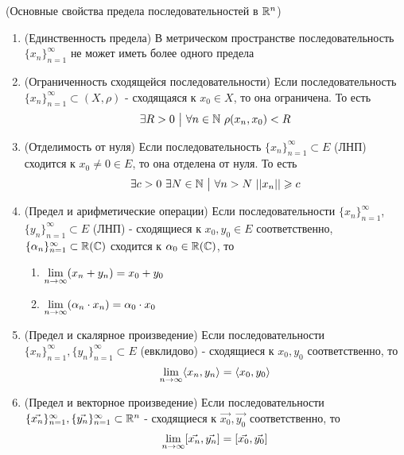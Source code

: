 \begin{theorem} (Основные свойства предела последовательностей в $\mathbb{R}^n$)
	\begin{enumerate}
		\item (Единственность предела) В метрическом пространстве последовательность $\{x_n\}_{n = 1}^\infty$ не может иметь более одного предела
		
		\item (Ограниченность сходящейся последовательности) Если последовательность $\{x_n\}_{n = 1}^\infty \subset (X, \rho)$ - сходящаяся к $x_0 \in X$, то она ограничена. То есть
		\[
			\exists R > 0 \ \big|\  \forall n \in \mathbb{N}\ \rho(x_n, x_0) < R
		\] 
		
		\item (Отделимость от нуля) Если последовательность $\{x_n\}_{n = 1}^\infty \subset E$ (ЛНП) сходится к $x_0 \neq 0 \in E$, то она отделена от нуля. То есть
		\[
			\exists c > 0\ \exists N \in \mathbb{N} \ \big|\  \forall n > N\ ||x_n|| \geqslant c
		\]
		
		\item (Предел и арифметические операции) Если последовательности $\{x_n\}_{n = 1}^\infty$, $\{y_n\}_{n = 1}^\infty \subset E$ (ЛНП) - сходящиеся к $x_0, y_0 \in E$ соответственно, $\{\alpha_n\}_{n = 1}^\infty \subset \mathbb{R}(\mathbb{C})$ сходится к $\alpha_0 \in \mathbb{R}(\mathbb{C})$, то
		\begin{enumerate}
			\item $\lim\limits_{n \to \infty} (x_n + y_n) = x_0 + y_0$
			
			\item $\lim\limits_{n \to \infty} (\alpha_n \cdot x_n) = \alpha_0 \cdot x_0$
		\end{enumerate}
	
	\item (Предел и скалярное произведение) Если последовательности $\{x_n\}_{n = 1}^\infty, \{y_n\}_{n = 1}^\infty \subset E$ (евклидово) - сходящиеся к $x_0, y_0$ соответственно, то
	\[
		\lim\limits_{n \to \infty} \langle x_n, y_n\rangle = \langle x_0, y_0\rangle
	\]
	
	\item (Предел и векторное произведение) Если последовательности $\{\vec{x_n}\}_{n = 1}^\infty, \{\vec{y_n}\}_{n = 1}^\infty \subset \mathbb{R}^n$ - сходящиеся к $\vec{x_0}, \vec{y_0}$ соответственно, то
	\[
		\lim\limits_{n \to \infty} [\vec{x_n}, \vec{y_n}] = [\vec{x_0}, \vec{y_0}]
	\]
	\end{enumerate}
\end{theorem}

